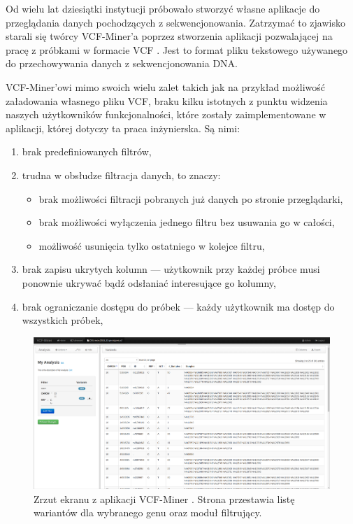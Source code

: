 \documentclass[a4paper,12pt,twoside]{article}
\begin{document}
Od wielu lat dziesiątki instytucji próbowało stworzyć własne aplikacje do przeglądania danych pochodzących z sekwencjonowania. Zatrzymać to zjawisko
starali się twórcy VCF-Miner'a \cite{miner} \cite{minerArt} poprzez
stworzenia aplikacji pozwalającej na pracę z próbkami w formacie VCF \cite{vcfformat}. Jest to format pliku tekstowego używanego do przechowywania
danych z sekwencjonowania DNA.

VCF-Miner'owi mimo swoich wielu zalet takich jak na przykład możliwość
załadowania własnego pliku VCF, braku kilku istotnych z
punktu widzenia naszych użytkowników funkcjonalności, które zostały zaimplementowane w aplikacji, której dotyczy ta praca inżynierska.
Są nimi:
\begin{enumerate}[1)]
\item brak predefiniowanych filtrów,
\item trudna w obsłudze filtracja danych, to znaczy:
\begin{itemize}
\item brak możliwości filtracji pobranych już danych po stronie przeglądarki,
\item brak możliwości wyłączenia jednego filtru bez usuwania go w całości,
\item możliwość usunięcia tylko ostatniego w kolejce filtru,
\end{itemize}
\item brak zapisu ukrytych kolumn — użytkownik przy każdej próbce
musi ponownie ukrywać bądź odsłaniać interesujące go kolumny,
\item brak ograniczanie dostępu do próbek — każdy użytkownik ma dostęp
do wszystkich próbek,
\end{enumerate}

\begin{figure}[h]
\includegraphics[width=\linewidth]{obrazy/exac/miner.png}
  \caption{Zrzut ekranu z aplikacji VCF-Miner \cite{miner}. Strona przestawia listę wariantów dla wybranego genu oraz moduł filtrujący.}
  \label{fig:minerpic}
\end{figure}
\end{document}
